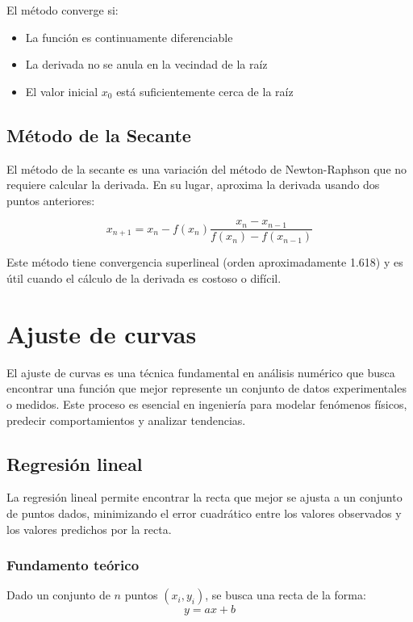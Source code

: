 \documentclass[12pt,a4paper]{article}
\begin{document}
El método converge si:
\begin{itemize}
    \item La función es continuamente diferenciable
    \item La derivada no se anula en la vecindad de la raíz
    \item El valor inicial $x_0$ está suficientemente cerca de la raíz
\end{itemize}

\subsection{Método de la Secante}

El método de la secante es una variación del método de Newton-Raphson que no requiere calcular la derivada. En su lugar, aproxima la derivada usando dos puntos anteriores:

\begin{equation}
    x_{n+1} = x_n - f(x_n) \frac{x_n - x_{n-1}}{f(x_n) - f(x_{n-1})}
\end{equation}

Este método tiene convergencia superlineal (orden aproximadamente 1.618) y es útil cuando el cálculo de la derivada es costoso o difícil.

\section{Ajuste de curvas}

El ajuste de curvas es una técnica fundamental en análisis numérico que busca encontrar una función que mejor represente un conjunto de datos experimentales o medidos. Este proceso es esencial en ingeniería para modelar fenómenos físicos, predecir comportamientos y analizar tendencias.

\subsection{Regresión lineal}

La regresión lineal permite encontrar la recta que mejor se ajusta a un conjunto de puntos dados, minimizando el error cuadrático entre los valores observados y los valores predichos por la recta.

\subsubsection{Fundamento teórico}

Dado un conjunto de $n$ puntos $(x_i, y_i)$, se busca una recta de la forma:
\begin{equation}
    y = ax + b
\end{equation}
\end{document}
